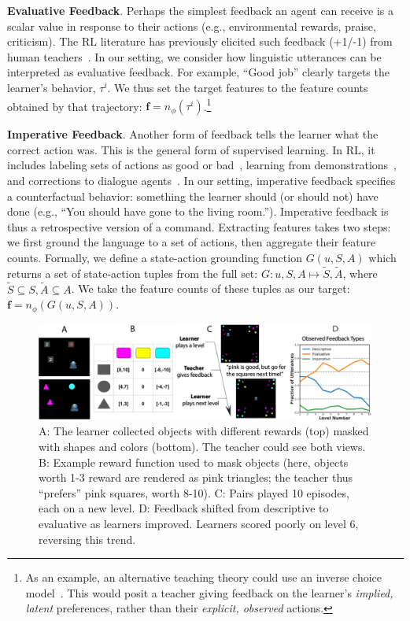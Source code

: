\documentclass[letterpaper]{article} %
\begin{document}
\textbf{Evaluative Feedback}. Perhaps the simplest feedback an agent can receive is a scalar value in response to their actions (e.g., environmental rewards, praise, criticism). The RL literature has previously elicited such feedback (+1/-1) from human teachers~\citep{thomaz2008teachable, Knox2009Interactively, macglashan2017interactive}. In our setting, we consider how linguistic utterances can be interpreted as evaluative feedback. For example, ``Good job'' clearly targets the learner's behavior, $\tau^i$. We thus set the target features to the feature counts obtained by that trajectory: $\mathbf{f} = n_\phi(\tau^i)$.\footnote{As an example, an alternative teaching theory could use an inverse choice model~\citep{mcfadden1974conditional}. This would posit a teacher giving feedback on the learner's \textit{implied, latent} preferences, rather than their \textit{explicit, observed} actions.}

\textbf{Imperative Feedback}. Another form of feedback tells the learner what the correct action was. This is the general form of supervised learning. In RL, it includes labeling sets of actions as good or bad~\citep{judah2010_critique, christiano2017deep}, learning from demonstrations~\citep{ross2010efficient, abbeel2004apprenticeship, ho2016showing}, and corrections to dialogue agents~\citep{li2016dialogue, chen-etal-2017-line}. In our setting, imperative feedback specifies a counterfactual behavior: something the learner should (or should not) have done (e.g., ``You should have gone to the living room.''). Imperative feedback is thus a retrospective version of a command. Extracting features takes two steps: we first ground the language to a set of actions, then aggregate their feature counts. Formally, we define a state-action grounding function $G(u, S, A)$ which returns a set of state-action tuples from the full set: $G: u, S, A \mapsto \tilde{S}, \tilde{A}$, where $\tilde{S} \subseteq S, \tilde{A} \subseteq A$. We take the feature counts of these tuples as our target: $\textbf{f} = n_\phi(G(u, S, A))$.

\begin{figure}[h!]
\begin{center}
\includegraphics[width=17.5cm]{images/task_aaai.pdf}
\end{center}
\caption{A: The learner collected objects with different rewards (top) masked with shapes and colors (bottom). The teacher could see both views. B: Example reward function used to mask objects (here, objects worth 1-3 reward are rendered as pink triangles; the teacher thus ``prefers'' pink squares, worth 8-10). C: Pairs played 10 episodes, each on a new level. D: Feedback shifted from descriptive to evaluative as learners improved. Learners scored poorly on level 6, reversing this trend.}
\label{task_ui}
\end{figure}
\end{document}

